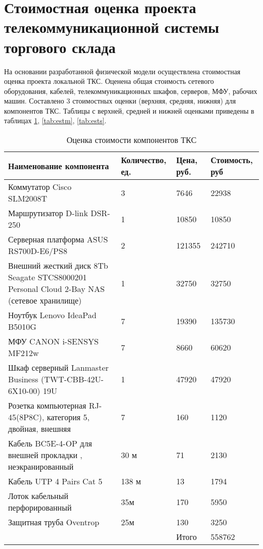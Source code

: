 \section{Стоимостная оценка проекта телекоммуникационной системы торгового склада}
\label{sec:5}

На основании разработанной физической модели осуществлена стоимостная оценка проекта локальной ТКС. Оценена общая стоимость сетевого оборудования, кабелей, телекоммуникационных шкафов, серверов, МФУ, рабочих машин. Составлено 3 стоимостных оценки (верхняя, средняя, нижняя) для компонентов ТКС. Таблицы с верхней, средней и нижней оценками приведены в таблицах \ref{tab:est}, \ref{tab:estm}, \ref{tab:ests}.

\begin{table}[H]
  \centering
  \caption{Оценка стоимости компонентов ТКС}
  \begin{tabular}{|p{7cm}|l|l|l|} \hline
    Наименование компонента & Количество, ед. & Цена, руб.& Стоимость, руб \\ \hline
    Коммутатор Cisco SLM2008T & 3 & 7646 & 22938 \\ \hline
    Маршрутизатор D-link DSR-250 & 1 & 10850 & 10850 \\ \hline
    Серверная платформа ASUS RS700D-E6/PS8 & 2 & 121355 & 242710 \\ \hline
    Внешний жесткий диск 8Tb Seagate STCS8000201 Personal Cloud 2-Bay NAS
(сетевое хранилище) & 1 & 32750 & 32750 \\ \hline
    Ноутбук Lenovo IdeaPad B5010G & 7 & 19390 & 135730 \\ \hline
    МФУ CANON i-SENSYS MF212w & 7 & 8660 & 60620 \\ \hline
    Шкаф серверный Lanmaster Business (TWT-CBB-42U-6X10-00) 19U & 1 & 47920 & 47920 \\ \hline
    Розетка компьютерная RJ-45(8P8C), категория 5, двойная, внешняя & 7 & 160 & 1120 \\ \hline
    Кабель BC5E-4-OP для внешней прокладки , неэкранированный & 30 м & 71 & 2130 \\ \hline
    Кабель UTP 4 Pairs Cat 5 & 138 м & 13 & 1794 \\ \hline
    Лоток кабельный перфорированный & 35м & 170 & 5950 \\ \hline
    Защитная труба Oventrop & 25м & 130 & 3250 \\ \hline
    & & Итого & 558762 \\ \hline
  \end{tabular}
  \label{tab:est}
\end{table}

